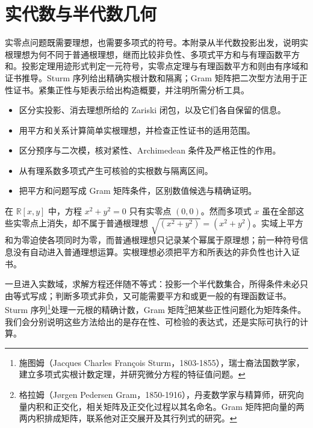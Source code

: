 
\chapter{实代数与半代数几何}
\label{b3:app:G}


\begin{chapterabstract}
	实零点问题既需要理想，也需要多项式的符号。本附录从半代数投影出发，说明实根理想为何不同于普通根理想，继而比较非负性、多项式平方和与有理函数平方和。投影定理用迹形式判定一元符号，实零点定理与有理函数平方和则由有序域和证书推导。Sturm 序列给出精确实根计数和隔离；Gram 矩阵把二次型方法用于正性证书。紧集正性与矩表示给出构造概要，并注明所需分析工具。
\end{chapterabstract}

\begin{learninggoals}
	\begin{itemize}
		\item 区分实投影、消去理想所给的 Zariski 闭包，以及它们各自保留的信息。
		\item 用平方和关系计算简单实根理想，并检查正性证书的适用范围。
		\item 区分预序与二次模，核对紧性、Archimedean 条件及严格正性的作用。
		\item 从有理系数多项式产生可核验的实根数与隔离区间。
		\item 把平方和问题写成 Gram 矩阵条件，区别数值候选与精确证明。
	\end{itemize}
\end{learninggoals}

在 \(\mathbb R[x,y]\) 中，方程 \(x^2+y^2=0\) 只有实零点 \((0,0)\)。然而多项式 \(x\) 虽在全部这些实零点上消失，却不属于普通根理想 \(\sqrt{(x^2+y^2)}=(x^2+y^2)\)。实域上平方和为零迫使各项同时为零，而普通根理想只记录某个幂属于原理想；前一种符号信息没有自动进入普通理想运算。实根理想必须把平方和所表达的非负性也计入证书。

\ProseParagraphBreak

一旦进入实数域，求解方程还伴随不等式：投影一个半代数集合，所得条件未必只由等式写成；判断多项式非负，又可能需要平方和或更一般的有理函数证书。Sturm 序列\footnote{施图姆（Jacques Charles François Sturm，1803-1855），瑞士裔法国数学家，建立多项式实根计数定理，并研究微分方程的特征值问题。}处理一元根的精确计数，Gram 矩阵\footnote{格拉姆（Jørgen Pedersen Gram，1850-1916），丹麦数学家与精算师，研究向量内积和正交化，相关矩阵及正交化过程以其名命名。Gram 矩阵把向量的两两内积排成矩阵，联系他对正交展开及其行列式的研究。}把某些正性问题化为矩阵条件。我们会分别说明这些方法给出的是存在性、可检验的表达式，还是实际可执行的计算。

